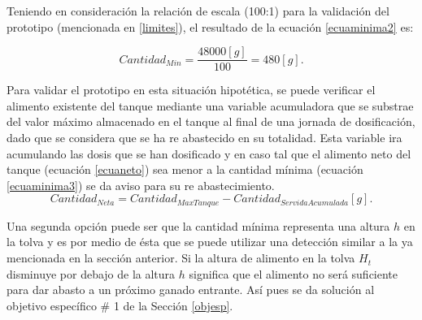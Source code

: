 Teniendo en consideración la relación de escala (100:1) para la validación del prototipo (mencionada en \ref{limites}), el resultado de la ecuación \ref{ecuaminima2} es:

\begin{equation}
    Cantidad_{Min} = \frac{48000[g]}{100} = 480[g]. \label{ecuaminima3}
\end{equation}


Para validar el prototipo en esta situación hipotética, se puede verificar el alimento existente del tanque mediante una variable acumuladora que se substrae del valor máximo almacenado en el tanque al final de una jornada de dosificación, dado que se considera que se ha re abastecido en su totalidad. Esta variable ira acumulando las dosis que se han dosificado y en caso tal que el alimento neto del tanque (ecuación \ref{ecuaneto}) sea menor a la cantidad mínima (ecuación \ref{ecuaminima3}) se da aviso para su re abastecimiento.\\

\vspace{-25}
\begin{equation}
    Cantidad_{Neta} = Cantidad_{Max Tanque} - Cantidad_{Servida Acumulada}[g] .  \label{ecuaneto}
\end{equation}

Una segunda opción puede ser que la cantidad mínima representa una altura $h$ en la tolva y es por medio de ésta que se puede utilizar una detección similar a la ya mencionada en la sección anterior. Si la altura de alimento en la tolva $H_t$ disminuye por debajo de la altura $h$ significa que el alimento no será suficiente para dar abasto a un próximo ganado entrante. Así pues se da solución al objetivo específico \# 1 de la Sección \ref{objesp}.\\


